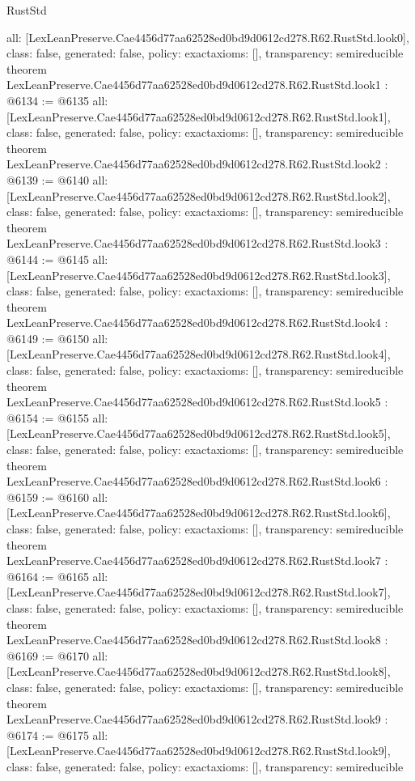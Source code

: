 \begin{lexlean}{RustStd}
\begin{coremodule}
{  all: [LexLeanPreserve.Cae4456d77aa62528ed0bd9d0612cd278.R62.RustStd.look0],
  class: false,
  generated: false,
  policy: exact{axioms: []},
  transparency: semireducible
}
theorem LexLeanPreserve.Cae4456d77aa62528ed0bd9d0612cd278.R62.RustStd.look1 : @6134 := @6135 {
  all: [LexLeanPreserve.Cae4456d77aa62528ed0bd9d0612cd278.R62.RustStd.look1],
  class: false,
  generated: false,
  policy: exact{axioms: []},
  transparency: semireducible
}
theorem LexLeanPreserve.Cae4456d77aa62528ed0bd9d0612cd278.R62.RustStd.look2 : @6139 := @6140 {
  all: [LexLeanPreserve.Cae4456d77aa62528ed0bd9d0612cd278.R62.RustStd.look2],
  class: false,
  generated: false,
  policy: exact{axioms: []},
  transparency: semireducible
}
theorem LexLeanPreserve.Cae4456d77aa62528ed0bd9d0612cd278.R62.RustStd.look3 : @6144 := @6145 {
  all: [LexLeanPreserve.Cae4456d77aa62528ed0bd9d0612cd278.R62.RustStd.look3],
  class: false,
  generated: false,
  policy: exact{axioms: []},
  transparency: semireducible
}
theorem LexLeanPreserve.Cae4456d77aa62528ed0bd9d0612cd278.R62.RustStd.look4 : @6149 := @6150 {
  all: [LexLeanPreserve.Cae4456d77aa62528ed0bd9d0612cd278.R62.RustStd.look4],
  class: false,
  generated: false,
  policy: exact{axioms: []},
  transparency: semireducible
}
theorem LexLeanPreserve.Cae4456d77aa62528ed0bd9d0612cd278.R62.RustStd.look5 : @6154 := @6155 {
  all: [LexLeanPreserve.Cae4456d77aa62528ed0bd9d0612cd278.R62.RustStd.look5],
  class: false,
  generated: false,
  policy: exact{axioms: []},
  transparency: semireducible
}
theorem LexLeanPreserve.Cae4456d77aa62528ed0bd9d0612cd278.R62.RustStd.look6 : @6159 := @6160 {
  all: [LexLeanPreserve.Cae4456d77aa62528ed0bd9d0612cd278.R62.RustStd.look6],
  class: false,
  generated: false,
  policy: exact{axioms: []},
  transparency: semireducible
}
theorem LexLeanPreserve.Cae4456d77aa62528ed0bd9d0612cd278.R62.RustStd.look7 : @6164 := @6165 {
  all: [LexLeanPreserve.Cae4456d77aa62528ed0bd9d0612cd278.R62.RustStd.look7],
  class: false,
  generated: false,
  policy: exact{axioms: []},
  transparency: semireducible
}
theorem LexLeanPreserve.Cae4456d77aa62528ed0bd9d0612cd278.R62.RustStd.look8 : @6169 := @6170 {
  all: [LexLeanPreserve.Cae4456d77aa62528ed0bd9d0612cd278.R62.RustStd.look8],
  class: false,
  generated: false,
  policy: exact{axioms: []},
  transparency: semireducible
}
theorem LexLeanPreserve.Cae4456d77aa62528ed0bd9d0612cd278.R62.RustStd.look9 : @6174 := @6175 {
  all: [LexLeanPreserve.Cae4456d77aa62528ed0bd9d0612cd278.R62.RustStd.look9],
  class: false,
  generated: false,
  policy: exact{axioms: []},
  transparency: semireducible
}
\end{coremodule}
\end{lexlean}
